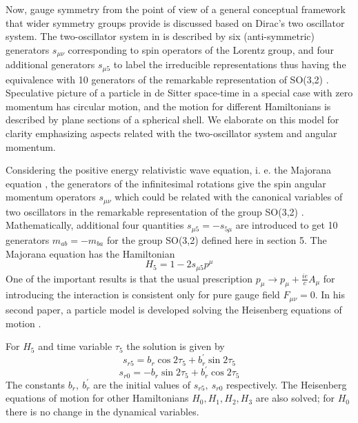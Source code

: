 \documentclass[aps, singlecolumn, showpacs]{revtex4-2}
\begin{document}
Now, gauge symmetry from the point of view of a general conceptual framework that wider symmetry groups provide is discussed based on Dirac's two oscillator system. The two-oscillator system in \cite{30,31} is described by six (anti-symmetric) generators $s_{\mu\nu}$ corresponding to spin operators of the Lorentz group, and four additional generators $s_{\mu 5}$ to label the irreducible representations thus having the equivalence with 10 generators of the remarkable representation of SO(3,2) \cite{15}. Speculative picture of a particle in de Sitter space-time \cite{31} in a special case with zero momentum has circular motion, and the motion for different Hamiltonians is described by plane sections of a spherical shell. We elaborate on this model for clarity emphasizing aspects related with the two-oscillator system and angular momentum.

Considering the positive energy relativistic wave equation, i. e. the Majorana equation \cite{30}, the generators of the infinitesimal rotations give the spin angular momentum operators $s_{\mu\nu}$ which could be related with the canonical variables of two oscillators in the remarkable representation of the group SO(3,2) \cite{15}. Mathematically, additional four quantities $s_{\mu 5} =-s_{5 \mu}$ are introduced to get 10 generators $m_{ab} =-m_{ba}$ for the group SO(3,2) defined here in section 5. The Majorana equation has the Hamiltonian
\begin{equation}
H_5 = 1 -2 s_{\mu 5} p^\mu
\end{equation}
One of the important results is that the usual prescription $p_\mu \rightarrow p_\mu +\frac{i e}{c} A_\mu$ for introducing the interaction is consistent only for pure gauge field $F_{\mu\nu} =0$. In his second paper, a particle model is developed solving the Heisenberg equations of motion \cite{31}.

For $H_5$ and time variable $\tau_5$ the solution is given by
\begin{equation}
s_{r5} =b_r \cos 2\tau_5 +b_r^\prime \sin 2\tau_5
\end{equation}
\begin{equation}
s_{r0} =-b_r \sin 2\tau_5 +b_r^\prime \cos 2\tau_5
\end{equation}
The constants $b_r,~ b_r^\prime$ are the initial values of $s_{r5},~ s_{r0}$ respectively. The Heisenberg equations of motion for other Hamiltonians $H_0, H_1, H_2, H_3$ are also solved; for $H_0$ there is no change in the dynamical variables. 
\end{document}
